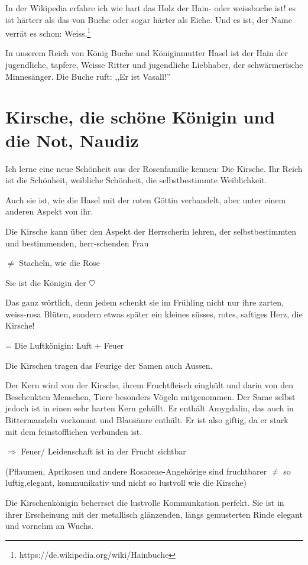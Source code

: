 \documentclass[11pt,titlepage,a5paper]{book}
\begin{document}
In der Wikipedia erfahre ich wie hart das Holz der Hain- oder weissbuche ist! es ist härterr als das von Buche oder sogar härter als Eiche. Und es ist, der Name verrät es schon: Weiss.\footnote{https://de.wikipedia.org/wiki/Hainbuche}

In unserem Reich von König Buche und Königinmutter Hasel ist der Hain der jugendliche, tapfere, Weisse Ritter und jugendliche Liebhaber, der schwärmerische Minnesänger. Die Buche ruft: ,,Er ist Vasall!''

\section*{Kirsche, die schöne Königin und die Not, Naudiz  }

Ich lerne eine neue Schönheit aus der Rosenfamilie kennen: Die Kirsche. Ihr Reich ist die Schönheit, weibliche Schönheit, die selbstbestimmte Weiblichkeit.

Auch sie ist, wie die Hasel mit der roten Göttin verbandelt, aber unter einem anderen Aspekt von ihr. 

Die Kirsche kann über den Aspekt der Herrscherin lehren, der selbstbestimmten und bestimmenden, herr-schenden Frau

$\neq$ Stacheln, wie die Rose

Sie ist die Königin der $\heartsuit$

Das ganz wörtlich, denn jedem schenkt sie im Frühling nicht nur ihre zarten, weiss-rosa Blüten, sondern etwas später ein kleines süsses, rotes, saftiges Herz, die Kirsche!

= Die Luftkönigin: Luft + Feuer

Die Kirschen tragen das Feurige der Samen auch Aussen.

Der Kern wird von der Kirsche, ihrem Fruchtfleisch einghült und darin von den Beschenkten Menschen, Tiere besonders Vögeln mitgenommen. Der Same selbst jedoch ist in einen sehr harten Kern gehüllt. Er enthält Amygdalin, das auch in Bittermandeln vorkommt und Blausäure enthält. Er ist also giftig, da er stark mit dem feinstofflichen verbunden ist.

$\Rightarrow$ Feuer/ Leidenschaft ist in der Frucht sichtbar

(Pflaumen, Aprikosen und andere Rosaceae-Angehörige sind fruchtbarer $\neq$ so luftig,elegant, kommunikativ und nicht so lustvoll wie die Kirsche)

Die Kirschenkönigin beherrsct die lustvolle Kommunkation perfekt. Sie ist in ihrer Erscheinung mit der metallisch glänzenden, längs gemusterten Rinde elegant und vornehm an Wuchs.
\end{document}
